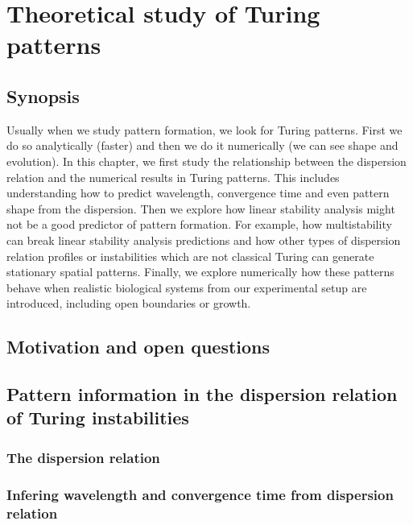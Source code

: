 \chapter{Theoretical study of Turing patterns }
\section{Synopsis}
Usually when we study pattern formation, we look for Turing patterns.
First we do so analytically (faster) and then we do it numerically (we can see shape and evolution).
In this chapter, we first study the relationship between the dispersion relation and the numerical results in Turing patterns.
This includes understanding how to predict wavelength, convergence time and even pattern shape from the dispersion.
Then we explore how linear stability analysis might not be a good predictor of pattern formation.
For example, how multistability can break linear stability analysis predictions and how other types of dispersion relation profiles or instabilities which are not classical Turing can generate stationary spatial patterns.
Finally, we explore numerically how these patterns behave when realistic biological systems from our experimental setup are introduced, including open boundaries or growth.
\section{Motivation and open questions}




\section{Pattern information in the dispersion relation of Turing instabilities}

\subsection{The dispersion relation}

\subsection{Infering wavelength and convergence time from dispersion relation}

